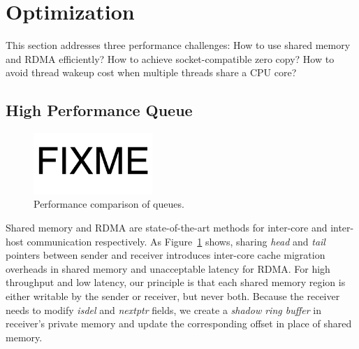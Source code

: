 \section{Optimization}
\label{sec:optimization}

This section addresses three performance challenges: How to use shared memory and RDMA efficiently? How to achieve socket-compatible zero copy? How to avoid thread wakeup cost when multiple threads share a CPU core?

\subsection{High Performance Queue}
\label{subsec:lockless-queue}

\begin{figure}[t]
	\centering
	\includegraphics[width=0.4\textwidth]{images/fixme.pdf}
	\vspace{-5pt}
	\caption{Performance comparison of queues.}
	\vspace{-10pt}
	\label{fig:queue-performance}
\end{figure}

Shared memory and RDMA are state-of-the-art methods for inter-core and inter-host communication respectively.
As Figure~\ref{fig:queue-performance} shows, sharing \emph{head} and \emph{tail} pointers between sender and receiver introduces inter-core cache migration overheads in shared memory and unacceptable latency for RDMA.
For high throughput and low latency, our principle is that each shared memory region is either writable by the sender or receiver, but never both.
Because the receiver needs to modify \emph{isdel} and \emph{nextptr} fields, we create a \emph{shadow ring buffer} in receiver's private memory and update the corresponding offset in place of shared memory.

